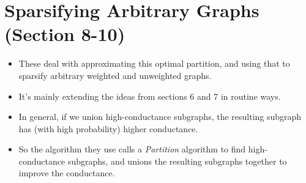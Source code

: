 \documentclass[11pt]{article}
\begin{document}
\section{Sparsifying Arbitrary Graphs (Section 8-10)}
\label{sec:org63f34ed}
\begin{itemize}
\item These deal with approximating this optimal partition, and using that to sparsify arbitrary weighted and unweighted graphs.
\item It's mainly extending the ideas from sections 6 and 7 in routine ways.
\item In general, if we union high-conductance subgraphs, the resulting subgraph has (with high probability) higher conductance.
\item So the algorithm they use calls a \emph{Partition} algorithm to find high-conductance subgraphs, and unions the resulting subgraphs together to improve the conductance.
\end{itemize}
\end{document}
